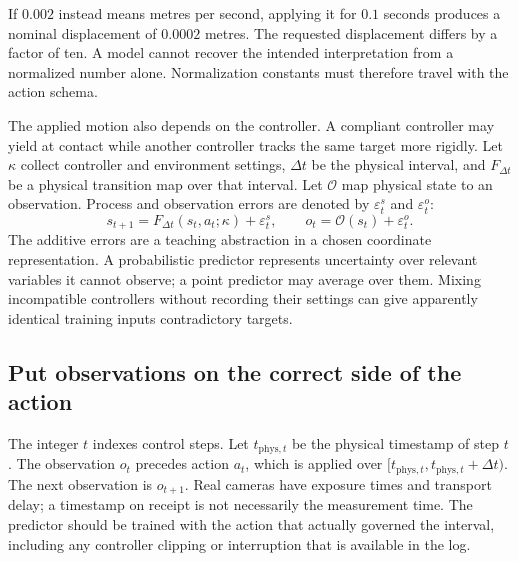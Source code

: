 If $0.002$ instead means metres per second, applying it for $0.1$ seconds produces a nominal displacement of $0.0002$ metres. The requested displacement differs by a factor of ten. A model cannot recover the intended interpretation from a normalized number alone. Normalization constants must therefore travel with the action schema.

The applied motion also depends on the controller. A compliant controller may yield at contact while another controller tracks the same target more rigidly. Let $\kappa$ collect controller and environment settings, $\Delta t$ be the physical interval, and $F_{\Delta t}$ be a physical transition map over that interval. Let $\mathcal O$ map physical state to an observation. Process and observation errors are denoted by $\varepsilon_t^{s}$ and $\varepsilon_t^{o}$:
\begin{equation}
 s_{t+1}=F_{\Delta t}(s_t,a_t;\kappa)+\varepsilon_t^{s},
 \qquad o_t=\mathcal O(s_t)+\varepsilon_t^{o}.
 \label{eq:middle-state}
\end{equation}
The additive errors are a teaching abstraction in a chosen coordinate representation. A probabilistic predictor represents uncertainty over relevant variables it cannot observe; a point predictor may average over them. Mixing incompatible controllers without recording their settings can give apparently identical training inputs contradictory targets.

\subsection{Put observations on the correct side of the action}
The integer $t$ indexes control steps. Let $t_{\mathrm{phys},t}$ be the physical timestamp of step $t$. The observation $o_t$ precedes action $a_t$, which is applied over $[t_{\mathrm{phys},t},t_{\mathrm{phys},t}+\Delta t)$. The next observation is $o_{t+1}$. Real cameras have exposure times and transport delay; a timestamp on receipt is not necessarily the measurement time. The predictor should be trained with the action that actually governed the interval, including any controller clipping or interruption that is available in the log.

